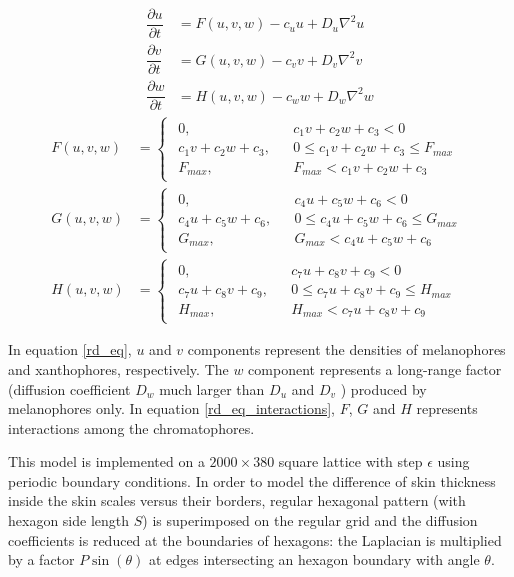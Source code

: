 \documentclass[a4paper]{article}
\begin{document}
\begin{align}
	\dfrac{\partial u}{\partial t} & = F ( u , v , w ) - c_u u + D_u \nabla^2 u \\
	\dfrac{\partial v}{\partial t} & = G ( u , v , w ) - c_v v + D_v \nabla^2 v \\
	\dfrac{\partial w}{\partial t} & = H ( u , v , w ) - c_w w + D_w \nabla^2 w
	\label{rd_eq}
\end{align}
\begin{align}
	F ( u , v , w ) & = \begin{cases} \begin{aligned}
		0, && c_1 v + c_2 w + c_3 < 0 \\
		c_1 v + c_2 w + c_3, && 0 \leq c_1 v + c_2 w + c_3 \leq F_{max} \\
		F_{max}, && F_{max} < c_1 v + c_2 w + c_3
	\end{aligned} \end{cases} \\
	G ( u , v , w ) & = \begin{cases} \begin{aligned}
		0, && c_4 u + c_5 w + c_6 < 0 \\
		c_4 u + c_5 w + c_6, && 0 \leq c_4 u + c_5 w + c_6 \leq G_{max} \\
		G_{max}, && G_{max} < c_4 u + c_5 w + c_6
	\end{aligned} \end{cases} \\
	H ( u , v , w ) & = \begin{cases} \begin{aligned}
		0, && c_7 u + c_8 v + c_9 < 0 \\
		c_7 u + c_8 v + c_9, && 0 \leq c_7 u + c_8 v + c_9 \leq H_{max} \\
		H_{max}, && H_{max} < c_7 u + c_8 v + c_9
	\end{aligned} \end{cases}
	\label{rd_eq_interactions}
\end{align}

In equation \ref{rd_eq}, $u$ and $v$ components represent the densities of melanophores and xanthophores, respectively. The $w$ component represents a long-range factor (diffusion coefficient $D_w$ much larger than $D_u$ and $D_v$ ) produced by melanophores only.
In equation \ref{rd_eq_interactions}, $F$, $G$ and $H$ represents interactions among the chromatophores.

This model is implemented on a $2000 \times 380$ square lattice with step $\epsilon$ using periodic boundary conditions. In order to model the difference of skin thickness inside the skin scales versus their borders, regular hexagonal pattern (with hexagon side length $S$) is superimposed on the regular grid and the diffusion coefficients is reduced at the boundaries of hexagons: the Laplacian is multiplied by a factor $P \sin (\theta)$ at edges intersecting an hexagon boundary with angle $\theta$.
\end{document}
